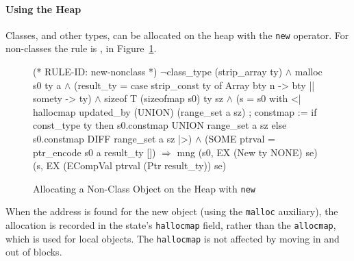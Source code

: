 \documentclass[11pt]{article}
\begin{document}
\paragraph{Using the Heap}
Classes, and other types, can be allocated on the heap with the
\texttt{new} operator.  For non-classes the rule is
, in Figure~\ref{fig:new-nonclass}.
\begin{figure}[htbp]
\begin{stdrule}
(* RULE-ID: new-nonclass *)
     \(\neg\)class_type (strip_array ty) \(\land\)
     malloc s0 ty a \(\land\)
     (result_ty = case strip_const ty of
                     Array bty n -> bty
                  || somety -> ty) \(\land\)
     sizeof T (sizeofmap s0) ty sz \(\land\)
     (s = s0 with <|
            hallocmap updated_by (UNION) (range_set a sz) ;
            constmap := if const_type ty then
                          s0.constmap UNION range_set a sz
                        else s0.constmap DIFF range_set a sz
          |>) \(\land\)
     (SOME ptrval = ptr_encode s0 a result_ty [])
   \(\Rightarrow\)
     mng (s0, EX (New ty NONE) se)
         (s, EX (ECompVal ptrval (Ptr result_ty)) se)
\end{stdrule}
\caption{Allocating a Non-Class Object on the Heap with \texttt{new}}
\label{fig:new-nonclass}
\end{figure}
When the address is found for the new object (using the
\texttt{malloc} auxiliary), the allocation is recorded in the state's
\texttt{hallocmap} field, rather than the \texttt{allocmap}, which is
used for local objects.  The \texttt{hallocmap} is not affected by
moving in and out of blocks.
\end{document}
